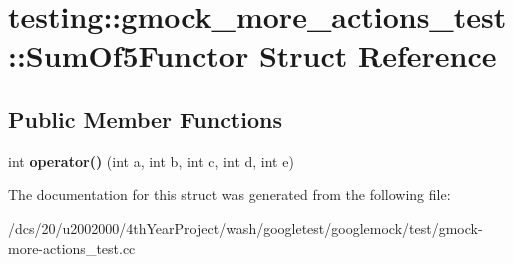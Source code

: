 \hypertarget{structtesting_1_1gmock__more__actions__test_1_1SumOf5Functor}{}\section{testing\+:\+:gmock\+\_\+more\+\_\+actions\+\_\+test\+:\+:Sum\+Of5\+Functor Struct Reference}
\label{structtesting_1_1gmock__more__actions__test_1_1SumOf5Functor}
\subsection*{Public Member Functions}
\begin{DoxyCompactItemize}
\item 
\mbox{\label{structtesting_1_1gmock__more__actions__test_1_1SumOf5Functor_ab7c80522ca7401c89e86eecb03fe1fbb}} 
int {\bfseries operator()} (int a, int b, int c, int d, int e)
\end{DoxyCompactItemize}


The documentation for this struct was generated from the following file\+:\begin{DoxyCompactItemize}
\item 
/dcs/20/u2002000/4th\+Year\+Project/wash/googletest/googlemock/test/gmock-\/more-\/actions\+\_\+test.\+cc\end{DoxyCompactItemize}
